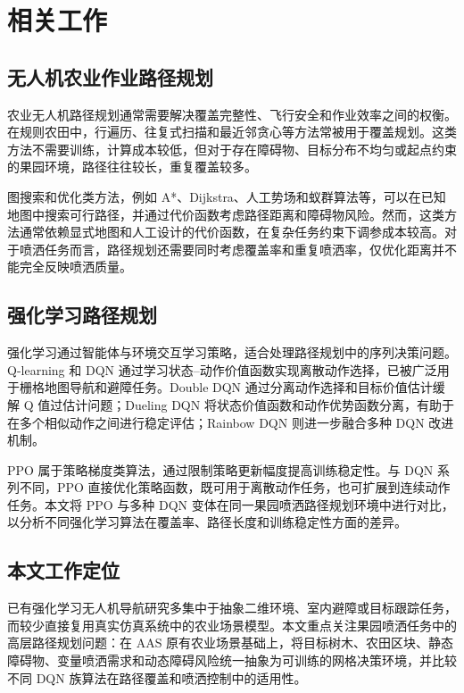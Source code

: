 \documentclass[UTF8]{ctexart}
\begin{document}
\section{相关工作}

\subsection{无人机农业作业路径规划}

农业无人机路径规划通常需要解决覆盖完整性、飞行安全和作业效率之间的权衡。在规则农田中，行遍历、往复式扫描和最近邻贪心等方法常被用于覆盖规划。这类方法不需要训练，计算成本较低，但对于存在障碍物、目标分布不均匀或起点约束的果园环境，路径往往较长，重复覆盖较多。

图搜索和优化类方法，例如 A*、Dijkstra、人工势场和蚁群算法等，可以在已知地图中搜索可行路径，并通过代价函数考虑路径距离和障碍物风险。然而，这类方法通常依赖显式地图和人工设计的代价函数，在复杂任务约束下调参成本较高。对于喷洒任务而言，路径规划还需要同时考虑覆盖率和重复喷洒率，仅优化距离并不能完全反映喷洒质量。

\subsection{强化学习路径规划}

强化学习通过智能体与环境交互学习策略，适合处理路径规划中的序列决策问题。Q-learning 和 DQN 通过学习状态--动作价值函数实现离散动作选择，已被广泛用于栅格地图导航和避障任务。Double DQN 通过分离动作选择和目标价值估计缓解 Q 值过估计问题；Dueling DQN 将状态价值函数和动作优势函数分离，有助于在多个相似动作之间进行稳定评估；Rainbow DQN 则进一步融合多种 DQN 改进机制。

PPO 属于策略梯度类算法，通过限制策略更新幅度提高训练稳定性。与 DQN 系列不同，PPO 直接优化策略函数，既可用于离散动作任务，也可扩展到连续动作任务。本文将 PPO 与多种 DQN 变体在同一果园喷洒路径规划环境中进行对比，以分析不同强化学习算法在覆盖率、路径长度和训练稳定性方面的差异。

\subsection{本文工作定位}

已有强化学习无人机导航研究多集中于抽象二维环境、室内避障或目标跟踪任务，而较少直接复用真实仿真系统中的农业场景模型。本文重点关注果园喷洒任务中的高层路径规划问题：在 AAS 原有农业场景基础上，将目标树木、农田区块、静态障碍物、变量喷洒需求和动态障碍风险统一抽象为可训练的网格决策环境，并比较不同 DQN 族算法在路径覆盖和喷洒控制中的适用性。
\end{document}
